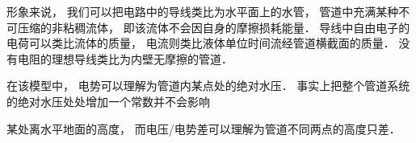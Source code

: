 


形象来说， 我们可以把电路中的导线类比为水平面上的水管， 管道中充满某种不可压缩的非粘稠流体， 即该流体不会因自身的摩擦损耗能量． 导线中自由电子的电荷可以类比流体的质量， 电流则类比液体单位时间流经管道横截面的质量． 没有电阻的理想导线类比为内壁无摩擦的管道．

在该模型中， 电势可以理解为管道内某点处的绝对水压． 事实上把整个管道系统的绝对水压处处增加一个常数并不会影响

某处离水平地面的高度， 而电压/电势差可以理解为管道不同两点的高度只差．

